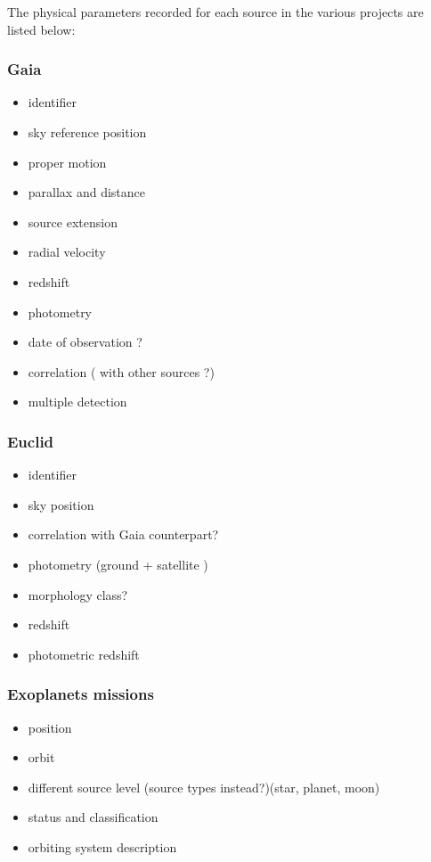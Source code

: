 \documentclass[11pt,a4paper]{ivoa}
\begin{document}
The physical parameters recorded for each source in the various projects are listed below:
\subsubsection{Gaia}
\begin{itemize}
    \item identifier
    \item sky reference position
    \item proper motion
    \item parallax and distance

    \item source extension
    \item radial velocity
    \item redshift
    \item photometry
    \item date of observation ?
    \item correlation ( with other sources ?)
    \item multiple detection
\end{itemize}


\subsubsection{Euclid}
\begin{itemize}
    \item identifier
    \item sky position
    \item correlation with Gaia counterpart?
    \item photometry (ground + satellite )
    \item morphology class?
    \item redshift
    \item photometric redshift
\end{itemize}

\subsubsection{Exoplanets missions}

\begin{itemize}
    \item position
    \item orbit
    \item different source level (source types instead?)(star, planet, moon)
    \item status and classification
    \item orbiting system description
\end{itemize}
\end{document}
